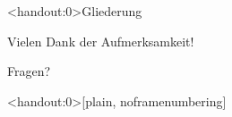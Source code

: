 \documentclass[aspectratio=169]{beamer} %
\newcommand{\figciteweburl}[1]{\\[-3mm]{\tiny aus: \citeauthortitleurl{#1}}}
\begin{document}

    \begin{frame}
        \vspace*{-0.6cm}
        \titlepage
        \vspace*{-1.6cm}
    \end{frame}
    
    \begin{frame}<handout:0>{Gliederung} %
      \setcounter{page}{1}      
        \tableofcontents
    \end{frame}
    
    







    \begin{frame}{Vielen Dank der Aufmerksamkeit!}
      \begin{center}
          \Huge Fragen?
      \end{center}
  \end{frame}

\begin{frame}<handout:0>[plain, noframenumbering]
\end{frame}
\end{document}
